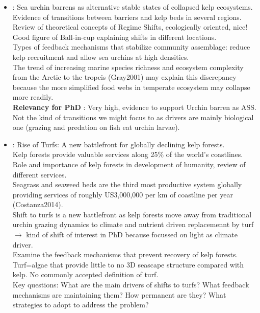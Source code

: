 \documentclass[]{report}
\begin{document}
\begin{itemize}
		\item \cite{filbee2014sea} : Sea urchin barrens as alternative stable states of collapsed kelp ecosystems.
		\\ Evidence of transitions between barriers and kelp beds in several regions.
		\\Review of theoretical concepts of Regime Shifts, ecologically oriented, nice!
		\\Good figure of Ball-in-cup explaining shifts in different locations.
		\\Types of feedback mechanisms that stabilize community assemblage: reduce kelp recruitment and allow sea urchins at high densities.
		\\The trend of increasing marine species richness and ecosystem complexity from the Arctic to the tropcis (Gray2001) may explain this discrepancy because the more simplified food webs in temperate ecosystem may collapse more readily.
		\\\textbf{Relevancy for PhD} : Very high, evidence to support Urchin barren as ASS. Not the kind of transitions we might focus to as drivers are mainly biological one (grazing and predation on fish eat urchin larvae).	
		\item \cite{filbee2018rise} : Rise of Turfs: A new battlefront for globally declining kelp forests.
		\\Kelp forests provide valuable services along 25$\%$ of the world's coastlines.
		\\ Role and importance of kelp forests in development of humanity, review of different services.
		\\ Seagrass and seaweed beds are the third most productive system globally providing services of roughly US3,000,000 per km of coastline per year (Costanza2014).
		\\Shift to turfs is a new battlefront as kelp forests move away from traditional urchin grazing dynamics to climate and nutrient driven replacemennt by turf $\rightarrow$ kind of shift of interest in PhD because focussed on light as climate driver.
		\\Examine the feedback mechanisms that prevent recovery of kelp forests.
		\\Turf=algae that provide little to no 3D seascape structure compared with kelp. No commonly accepted definition of turf.
		\\Key questions: What are the main drivers of shifts to turfs? What feedback mechanisms are maintaining them? How permanent are they? What strategies to adopt to address the problem?

\end{itemize}
\end{document}
